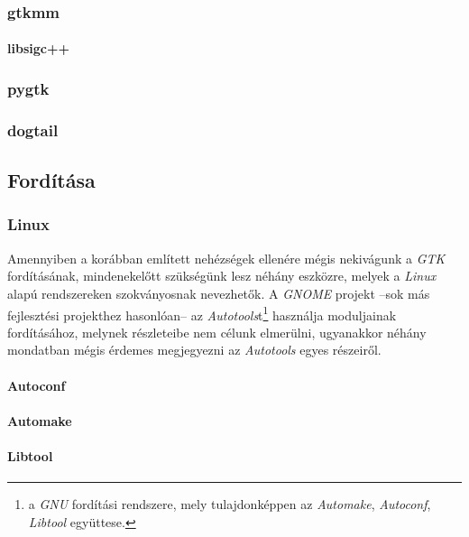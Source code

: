 \subsubsection{gtkmm}

\paragraph{libsigc++}

\subsubsection{pygtk}

\subsubsection{dogtail}

\subsection{Fordítása}

\subsubsection{Linux}

Amennyiben a korábban említett nehézségek ellenére mégis nekivágunk a \textit{GTK} fordításának, mindenekelőtt szükségünk lesz néhány eszközre, melyek a \textit{Linux} alapú rendszereken szokványosnak nevezhetők. A \textit{GNOME} projekt --sok más fejlesztési projekthez hasonlóan-- az \textit{Autotools}t\footnote{a \textit{GNU} fordítási rendszere, mely tulajdonképpen az \textit{Automake}, \textit{Autoconf}, \textit{Libtool} együttese.} használja moduljainak fordításához, melynek részleteibe nem célunk elmerülni, ugyanakkor néhány mondatban mégis érdemes megjegyezni az \textit{Autotools} egyes részeiről.

\paragraph{Autoconf}
\paragraph{Automake}
\paragraph{Libtool}

